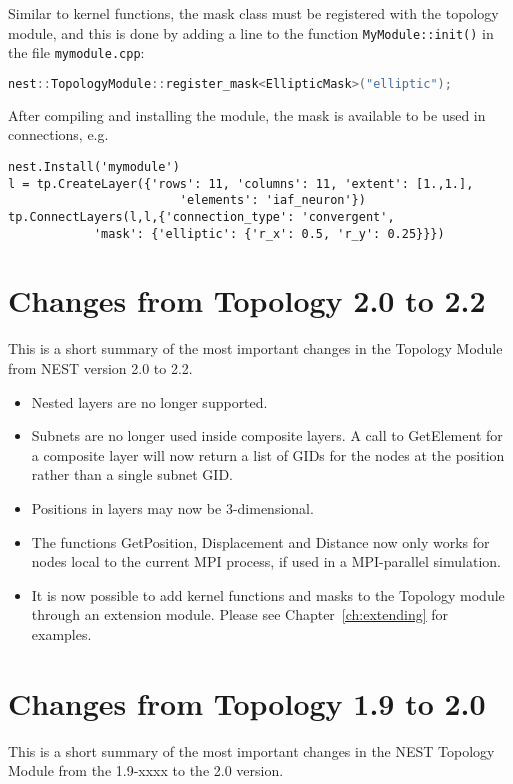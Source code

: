 \documentclass[a4paper,12pt]{report}
\begin{document}
Similar to kernel functions, the mask class must be registered with the
topology module, and this is done by adding a line to the function
\lstinline!MyModule::init()! in the file \lstinline!mymodule.cpp!:
\begin{lstlisting}[language=C++]
    nest::TopologyModule::register_mask<EllipticMask>("elliptic");
\end{lstlisting}
After compiling and installing the module, the mask is available to be used
in connections, e.g.
\begin{lstlisting}
nest.Install('mymodule')
l = tp.CreateLayer({'rows': 11, 'columns': 11, 'extent': [1.,1.],
                        'elements': 'iaf_neuron'})
tp.ConnectLayers(l,l,{'connection_type': 'convergent',
            'mask': {'elliptic': {'r_x': 0.5, 'r_y': 0.25}}})
\end{lstlisting}


\chapter{Changes from Topology 2.0 to 2.2}\label{sec:changes}

This is a short summary of the most important changes in the Topology
Module from NEST version 2.0 to 2.2.

\begin{itemize}
\item Nested layers are no longer supported.
\item Subnets are no longer used inside composite layers. A call to
  GetElement for a composite layer will now return a list of GIDs for the
  nodes at the position rather than a single subnet GID.
\item Positions in layers may now be 3-dimensional.
\item The functions GetPosition, Displacement and Distance now only works
  for nodes local to the current MPI process, if used in a MPI-parallel
  simulation.
\item It is now possible to add kernel functions and masks to the Topology
  module through an extension module. Please see Chapter~\ref{ch:extending}
  for examples.
\end{itemize}

\chapter{Changes from Topology 1.9 to 2.0}\label{sec:changes2}

This is a short summary of the most important changes in the NEST
Topology Module from the 1.9-xxxx to the 2.0 version.
\end{document}
